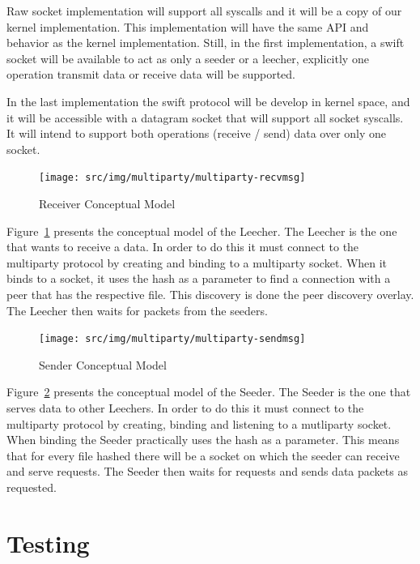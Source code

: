 Raw socket implementation will support all syscalls and it will be a copy of
our kernel implementation.  This implementation will have the same API and
behavior as the kernel implementation. Still, in the first implementation, a
swift socket will be available to act as only a seeder or a leecher,
explicitly one operation transmit data or receive data will be supported.

In the last implementation the swift protocol will be develop in kernel space,
and it will be accessible with a datagram socket that will support all socket
syscalls. It will intend to support both operations (receive / send) data over
only one socket.

\begin{figure}
  \centering
  \texttt{[image: src/img/multiparty/multiparty-recvmsg]}
  \caption{Receiver Conceptual Model}
  \label{fig:multiparty:multiparty-recvmsg}
\end{figure}

Figure~\ref{fig:multiparty:multiparty-recvmsg} presents the conceptual model
of the Leecher. The Leecher is the one that wants to receive a data. In order
to do this it must connect to the multiparty protocol by creating and binding
to a multiparty socket. When it binds to a socket, it uses the hash as a
parameter to find a connection with a peer that has the respective file. This
discovery is done the peer discovery overlay. The Leecher then waits for
packets from the seeders.

\begin{figure}
  \centering
  \texttt{[image: src/img/multiparty/multiparty-sendmsg]}
  \caption{Sender Conceptual Model}
  \label{fig:multiparty:multiparty-sendmsg}
\end{figure}

Figure~\ref{fig:multiparty:multiparty-sendmsg} presents the conceptual model
of the Seeder. The Seeder is the one that serves data to other Leechers. In
order to do this it must connect to the multiparty protocol by creating,
binding and listening to a mutliparty socket. When binding the Seeder
practically uses the hash as a parameter. This means that for every file
hashed there will be a socket on which the seeder can receive and serve
requests. The Seeder then waits for requests and sends data packets as
requested.

\section{Testing}
\label{sec:multiparty:testing}

